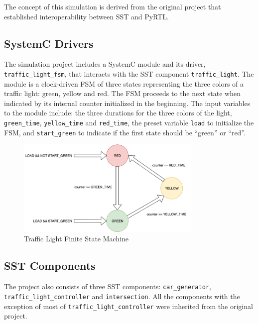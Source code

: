 \documentclass{article}
\begin{document}
  The concept of this simulation is derived from the original project that established
  interoperability between SST and PyRTL.\cite{pyrtl-sst}

    \subsection{SystemC Drivers}
    The simulation project includes a SystemC module and its driver, \lstinline{traffic_light_fsm},
    that interacts with the SST component \lstinline{traffic_light}. The module is a clock-driven
    FSM of three states representing the three colors of a traffic light: green, yellow and red. The
    FSM proceeds to the next state when indicated by its internal counter initialized in the
    beginning. The input variables to the module include: the three durations for the three colors
    of the light, \lstinline{green_time}, \lstinline{yellow_time} and \lstinline{red_time}, the
    preset variable \lstinline{load} to initialize the FSM, and \lstinline{start_green} to indicate
    if the first state should be ``green'' or ``red''.

    \begin{figure}[!h]
      \centering
      \includegraphics[width=3.5in]{diagrams/fsm.png}
      \caption{Traffic Light Finite State Machine}
      \label{fig:fsm}
    \end{figure}

    \subsection{SST Components}
    The project also consists of three SST components: \lstinline{car_generator},
    \lstinline{traffic_light_controller} and \lstinline{intersection}. All the components with the
    exception of most of \lstinline{traffic_light_controller} were inherited from the original
    project.
\end{document}
